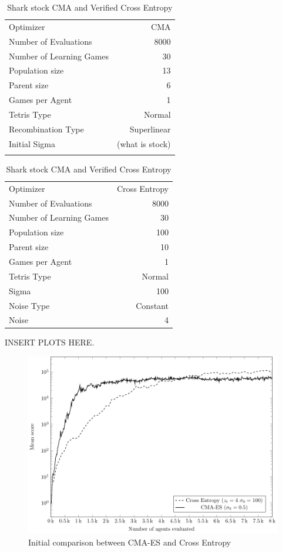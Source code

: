 \begin{table}[h]
\centering
\small
\caption{Shark stock CMA and Verified Cross Entropy}
\begin{tabular}{l r}
Optimizer & CMA\\
Number of Evaluations & 8000\\
Number of Learning Games & 30\\
Population size& 13\\
Parent size & 6\\
Games per Agent & 1\\
Tetris Type & Normal\\
\hline
Recombination Type & Superlinear\\
Initial Sigma & (what is stock)\\
\quad & \quad
\end{tabular}
\quad
\begin{tabular}{l r}
Optimizer & Cross Entropy\\
Number of Evaluations & 8000\\
Number of Learning Games & 30\\
Population size & 100\\
Parent size & 10\\
Games per Agent & 1\\
Tetris Type & Normal\\
\hline
Sigma & 100\\
Noise Type & Constant\\
Noise & 4
\end{tabular}
\end{table}

INSERT PLOTS HERE.

\begin{figure}[H]
\includegraphics[scale=1]{plots/cmaCePlot}
\caption{Initial comparison between CMA-ES and Cross Entropy \label{fig:CMA_VS_CE_00}}
\end{figure}

